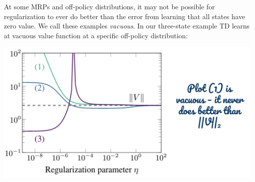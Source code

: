 At some MRPs and off-policy distributions, it may not be possible for regularization to ever do better than the error from learning that all states have zero value. We call these examples \emph{vacuous}.
In our three-state example TD learns at vacuous value function at a specific off-policy distribution:
\begin{center}
    \hspace*{1in}
    \includegraphics[scale=0.4]{parts/vacuous/vacuousactual.png}
\end{center}
\vspace{-.5in}

